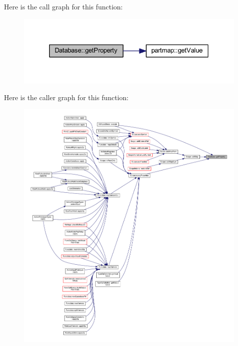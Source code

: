 Here is the call graph for this function\+:
\nopagebreak
\begin{figure}[H]
\begin{center}
\leavevmode
\includegraphics[width=326pt]{class_database_a1337718ffa932cf80a4d0d27e9998a06_cgraph}
\end{center}
\end{figure}
Here is the caller graph for this function\+:
\nopagebreak
\begin{figure}[H]
\begin{center}
\leavevmode
\includegraphics[width=350pt]{class_database_a1337718ffa932cf80a4d0d27e9998a06_icgraph}
\end{center}
\end{figure}
\mbox{\label{class_database_ab3840564f424238dd3a498fdb1a02644}} 
